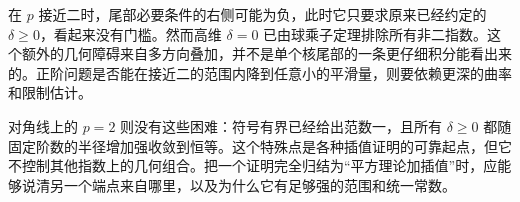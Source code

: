 \ProseParagraphBreak

在 \(p\) 接近二时，尾部必要条件的右侧可能为负，此时它只要求原来已经约定的 \(\delta\geq0\)，看起来没有门槛。然而高维 \(\delta=0\) 已由球乘子定理排除所有非二指数。这个额外的几何障碍来自多方向叠加，并不是单个核尾部的一条更仔细积分能看出来的。正阶问题是否能在接近二的范围内降到任意小的平滑量，则要依赖更深的曲率和限制估计。

\ProseParagraphBreak

对角线上的 \(p=2\) 则没有这些困难：符号有界已经给出范数一，且所有 \(\delta\geq0\) 都随固定阶数的半径增加强收敛到恒等。这个特殊点是各种插值证明的可靠起点，但它不控制其他指数上的几何组合。把一个证明完全归结为“平方理论加插值”时，应能够说清另一个端点来自哪里，以及为什么它有足够强的范围和统一常数。
